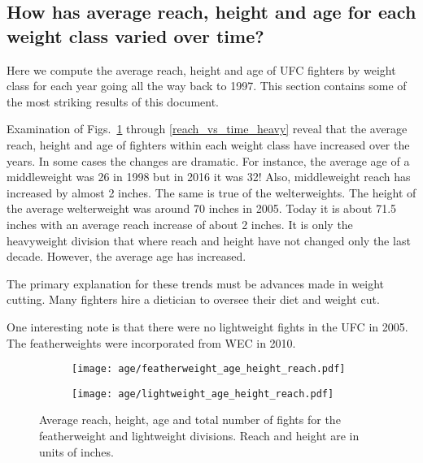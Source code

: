 \clearpage
\subsection*{How has average reach, height and age for each weight class varied over time?}

Here we compute the average reach, height and age of UFC fighters
by weight class
for each year going all the way back to 1997. This section
contains some of the most striking results of this document.

Examination of Figs.~\ref{reach_vs_time_light} through
\ref{reach_vs_time_heavy} reveal that the average reach,
height and age of fighters within each weight class
have increased over the years. In some cases the changes
are dramatic.
For instance, the average age of a middleweight was
26 in 1998 but in 2016 it was 32! Also, middleweight reach
has increased by almost 2 inches. The same is true of
the welterweights.
The height of the average welterweight was around 70 inches in 2005.
Today it is about 71.5 inches with an average reach increase of
about 2 inches. It is only the heavyweight division that where
reach and height have not changed only the last decade. However,
the average age has increased.

The primary explanation for these trends must be advances made in
weight cutting. Many fighters hire a dietician to oversee their
diet and weight cut.

One interesting note is that there were no lightweight fights in the UFC
in 2005. The featherweights were incorporated from WEC in 2010.

\begin{figure}[h]
\begin{center}
\begin{subfigure}{8cm}
\texttt{[image: age/featherweight\_age\_height\_reach.pdf]}
\end{subfigure}
\begin{subfigure}{8cm}
\texttt{[image: age/lightweight\_age\_height\_reach.pdf]}
\end{subfigure}
\caption{Average reach, height, age and total number
of fights
for the featherweight and lightweight divisions.
Reach and height are in units of inches.}
\label{reach_vs_time_light}
\end{center}
\end{figure}

